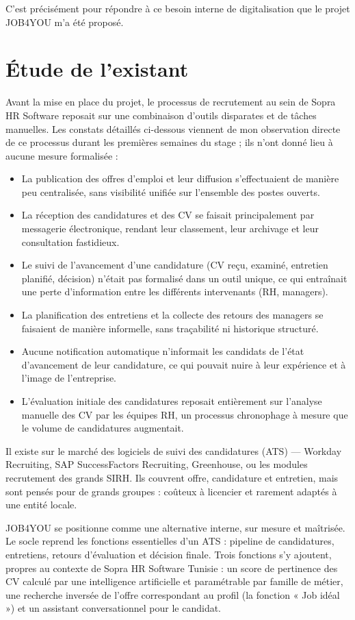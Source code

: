\documentclass[]{./tpl/isipfe}
\begin{document}
C’est précisément pour répondre à ce besoin interne de digitalisation que le projet JOB4YOU m’a été proposé.

\section{Étude de l’existant}
\label{sec_1_3}
Avant la mise en place du projet, le processus de recrutement au sein de Sopra HR Software reposait sur une combinaison d’outils disparates et de tâches manuelles. Les constats détaillés ci-dessous viennent de mon observation directe de ce processus durant les premières semaines du stage ; ils n’ont donné lieu à aucune mesure formalisée :

\begin{itemize}
\item La publication des offres d’emploi et leur diffusion s’effectuaient de manière peu centralisée, sans visibilité unifiée sur l’ensemble des postes ouverts.
\item La réception des candidatures et des CV se faisait principalement par messagerie électronique, rendant leur classement, leur archivage et leur consultation fastidieux.
\item Le suivi de l’avancement d’une candidature (CV reçu, examiné, entretien planifié, décision) n’était pas formalisé dans un outil unique, ce qui entraînait une perte d’information entre les différents intervenants (RH, managers).
\item La planification des entretiens et la collecte des retours des managers se faisaient de manière informelle, sans traçabilité ni historique structuré.
\item Aucune notification automatique n’informait les candidats de l’état d’avancement de leur candidature, ce qui pouvait nuire à leur expérience et à l’image de l’entreprise.
\item L’évaluation initiale des candidatures reposait entièrement sur l’analyse manuelle des CV par les équipes RH, un processus chronophage à mesure que le volume de candidatures augmentait.
\end{itemize}

Il existe sur le marché des logiciels de suivi des candidatures (ATS) — Workday Recruiting, SAP SuccessFactors Recruiting, Greenhouse, ou les modules recrutement des grands SIRH. Ils couvrent offre, candidature et entretien, mais sont pensés pour de grands groupes : coûteux à licencier et rarement adaptés à une entité locale.

JOB4YOU se positionne comme une alternative interne, sur mesure et maîtrisée. Le socle reprend les fonctions essentielles d’un ATS : pipeline de candidatures, entretiens, retours d’évaluation et décision finale. Trois fonctions s’y ajoutent, propres au contexte de Sopra HR Software Tunisie : un score de pertinence des CV calculé par une intelligence artificielle et paramétrable par famille de métier, une recherche inversée de l’offre correspondant au profil (la fonction « Job idéal ») et un assistant conversationnel pour le candidat.
\end{document}
